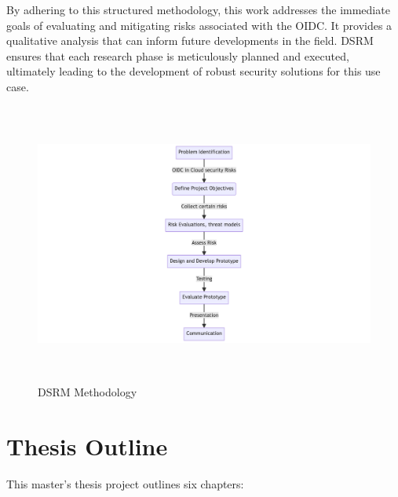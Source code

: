 By adhering to this structured methodology, this work addresses the immediate goals of evaluating and mitigating risks associated with the OIDC.
It provides a qualitative analysis that can inform future developments in the field.
DSRM ensures that each research phase is meticulously planned and executed, ultimately leading to the development of robust security solutions for this use case.

\begin{figure}[h!]
\centering
\label{fig:dsrm}
\includegraphics[width=\textwidth, height=350px]{pics/dsrm.png}
\caption{DSRM Methodology}
\end{figure}
\newpage
\section{Thesis Outline}

This master's thesis project outlines six chapters:

